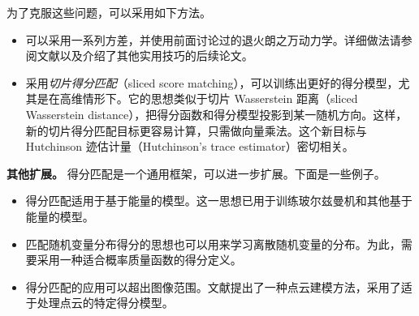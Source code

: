 为了克服这些问题，可以采用如下方法。
\begin{itemize}
  \item 可以采用一系列方差，并使用前面讨论过的退火朗之万动力学。详细做法请参阅文献以及介绍了其他实用技巧的后续论文。
  \item 采用\emph{切片得分匹配}（sliced score matching），可以训练出更好的得分模型，尤其是在高维情形下。它的思想类似于切片 Wasserstein 距离（sliced Wasserstein distance），把得分函数和得分模型投影到某一随机方向。这样，新的切片得分匹配目标更容易计算，只需做向量乘法。这个新目标与 Hutchinson 迹估计量（Hutchinson's trace estimator）密切相关。
\end{itemize}

\textbf{其他扩展。} 得分匹配是一个通用框架，可以进一步扩展。下面是一些例子。
\begin{itemize}
  \item 得分匹配适用于基于能量的模型。这一思想已用于训练玻尔兹曼机和其他基于能量的模型。
  \item 匹配随机变量分布得分的思想也可以用来学习离散随机变量的分布。为此，需要采用一种适合概率质量函数的得分定义。
  \item 得分匹配的应用可以超出图像范围。文献提出了一种点云建模方法，采用了适于处理点云的特定得分模型。
\end{itemize}




\FloatBarrier

